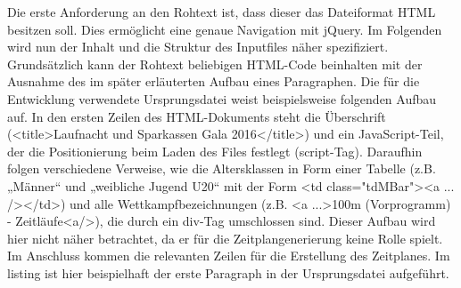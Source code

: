 {Die erste Anforderung an den Rohtext ist, dass dieser das Dateiformat HTML besitzen soll. Dies ermöglicht eine genaue Navigation mit jQuery. Im Folgenden wird nun der Inhalt und die Struktur des Inputfiles näher spezifiziert. Grundsätzlich kann der Rohtext beliebigen HTML-Code beinhalten mit der Ausnahme des im später erläuterten Aufbau eines Paragraphen. 
Die für die Entwicklung verwendete Ursprungsdatei weist beispielsweise folgenden Aufbau auf. In den ersten Zeilen des HTML-Dokuments steht die Überschrift (<title>Laufnacht und Sparkassen Gala 2016</title>) und ein JavaScript-Teil, der die Positionierung beim Laden des Files festlegt (script-Tag). Daraufhin folgen verschiedene Verweise, wie die Altersklassen in Form einer Tabelle (z.B. „Männer“ und „weibliche Jugend U20“ mit der Form <td class="tdMBar"><a ... /></td>) und alle Wettkampfbezeichnungen (z.B. <a ...>100m (Vorprogramm) - Zeitläufe<a/>), die durch ein div-Tag umschlossen sind. Dieser Aufbau wird hier nicht näher betrachtet, da er für die Zeitplangenerierung keine Rolle spielt.
Im Anschluss kommen die relevanten Zeilen für die Erstellung des Zeitplanes. Im listing ist hier beispielhaft der erste Paragraph in der Ursprungsdatei aufgeführt.\\
\lstset{language=html}


}
